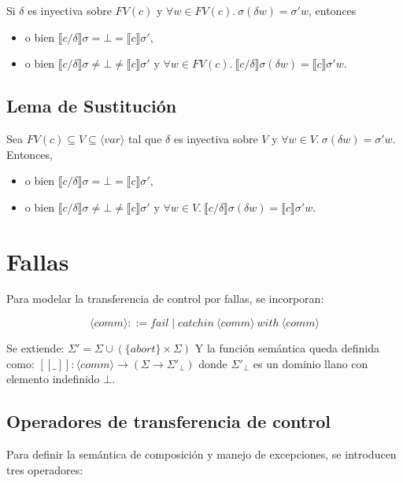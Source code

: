 \documentclass[a4paper,11pt]{article}
\begin{document}
Si $\delta$ es inyectiva sobre $FV(c)$ y $\forall w \in FV(c). \ \sigma(\delta w) = \sigma' w$, entonces
\begin{itemize}
    \item o bien $\llbracket c/\delta \rrbracket \sigma = \bot = \llbracket c \rrbracket \sigma'$,
    \item o bien $\llbracket c/\delta \rrbracket \sigma \neq \bot \neq \llbracket c \rrbracket \sigma'$ y $\forall w \in FV(c). \ \llbracket c/\delta \rrbracket \sigma(\delta w) = \llbracket c \rrbracket \sigma' w$.
\end{itemize}

\subsection{Lema de Sustitución}
Sea $FV(c) \subseteq V \subseteq \langle var \rangle$ tal que $\delta$ es inyectiva sobre $V$ y $\forall w \in V. \ \sigma(\delta w) = \sigma' w$. Entonces,
\begin{itemize}
    \item o bien $\llbracket c/\delta \rrbracket \sigma = \bot = \llbracket c \rrbracket \sigma'$,
    \item o bien $\llbracket c/\delta \rrbracket \sigma \neq \bot \neq \llbracket c \rrbracket \sigma'$ y $\forall w \in V. \ \llbracket c/\delta \rrbracket \sigma(\delta w) = \llbracket c \rrbracket \sigma' w$.
\end{itemize}

\section{Fallas}

Para modelar la transferencia de control por fallas, se incorporan:

\[
\langle comm \rangle ::= fail \mid catchin \ \langle comm \rangle \ with \ \langle comm \rangle
\]

Se extiende: $\Sigma' = \Sigma \cup (\{abort\} \times \Sigma)$
Y la función semántica queda definida como:
$[[\_]] : \langle comm \rangle \to (\Sigma \to \Sigma'_\bot)
$
donde $\Sigma'_\bot$ es un dominio llano con elemento indefinido $\bot$.

\subsection{Operadores de transferencia de control}

Para definir la semántica de composición y manejo de excepciones, se introducen tres operadores:
\end{document}
